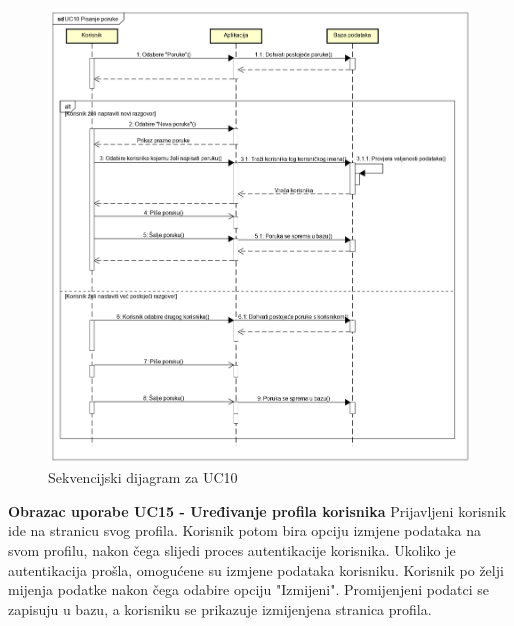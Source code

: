 				\begin{figure}[H]
					\begin{center}
						\includegraphics[width=15cm]{slike/UC10.PNG}
					\end{center}
					\caption{Sekvencijski dijagram za UC10}
					\label{fig:uc10}
				\end{figure}
				
				\eject
				 \textbf{Obrazac uporabe UC15 - Uređivanje profila korisnika}
			\newline
			{Prijavljeni korisnik ide na stranicu svog profila.
			Korisnik potom bira opciju izmjene podataka na svom profilu, nakon čega slijedi proces autentikacije korisnika. Ukoliko je autentikacija prošla, omogućene su izmjene podataka korisniku. Korisnik po želji mijenja podatke nakon čega odabire opciju "Izmijeni". Promijenjeni podatci se zapisuju u bazu, a korisniku se prikazuje izmijenjena stranica profila.}\\
				
